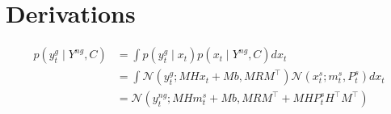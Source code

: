 \documentclass{article}
\newcommand{\norm}[3]{\mathcal{N}\left(#1; #2, #3\right)} %
\let\Oldsection\section
\renewcommand{\section}{\FloatBarrier\Oldsection}
\begin{document}
\section{Derivations}

\setcounter{equation}{0} 

\begin{equation}\label{eq:deriv_predictions}
\begin{split}
    p(y_t^g \mid Y^{ng}, C) &= \int p(y^g_t \mid x_t) p(x_t \mid Y^{ng}, C) dx_t\\
    & = \int \norm{y_t^g}{MHx_t + Mb}{MRM^\top} \norm{x^s_t}{m^s_t}{P^s_t} dx_t\\
    & = \norm{y^{ng}_t}{MHm^s_t + Mb}{MRM^\top + MHP^s_tH^\top M^\top}
\end{split}
\end{equation}
\end{document}
